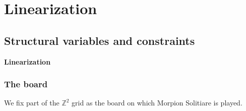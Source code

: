 \documentclass[pdftex]{beamer}
\newcommand{\unitsize}{0.25cm}
\begin{document}
\section{Linearization}
\subsection{Structural variables and constraints}

%
%

\begin{frame}[plain]

\vspace{1cm}
\centering\Huge\bf
Linearization
\end{frame}

\begin{frame}
\frametitle{The board}

\begin{center}
\scalebox{0.8}{
\begin{tikzpicture}
\draw[step=2*\unitsize,gray!30,very thin,shift={(-\unitsize, -\unitsize)}] (-6.0*\unitsize,-6.0*\unitsize) grid (26.0*\unitsize,16.0*\unitsize);
\end{tikzpicture}
}
\end{center}

We fix part of the $\mathbb{Z}^2$ grid as the board on which Morpion Solitiare is played.

\end{frame}
\end{document}
